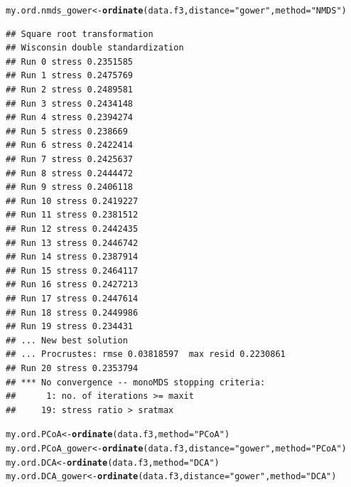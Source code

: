 \documentclass[12pt]{article}\usepackage[]{graphicx}\usepackage[]{color}
\makeatletter
\newcommand{\hlstr}[1]{\textcolor[rgb]{0.192,0.494,0.8}{#1}}%
\newcommand{\hlstd}[1]{\textcolor[rgb]{0.345,0.345,0.345}{#1}}%
\newcommand{\hlkwb}[1]{\textcolor[rgb]{0.69,0.353,0.396}{#1}}%
\newcommand{\hlkwc}[1]{\textcolor[rgb]{0.333,0.667,0.333}{#1}}%
\newcommand{\hlkwd}[1]{\textcolor[rgb]{0.737,0.353,0.396}{\textbf{#1}}}%
\newenvironment{kframe}{%
 \def\at@end@of@kframe{}%
 \ifinner\ifhmode%
  \def\at@end@of@kframe{\end{minipage}}%
  \begin{minipage}{\columnwidth}%
 \fi\fi%
 \def\FrameCommand##1{\hskip\@totalleftmargin \hskip-\fboxsep
 \colorbox{shadecolor}{##1}\hskip-\fboxsep
     \hskip-\linewidth \hskip-\@totalleftmargin \hskip\columnwidth}%
 \MakeFramed {\advance\hsize-\width
   \@totalleftmargin\z@ \linewidth\hsize
   \@setminipage}}%
 {\par\unskip\endMakeFramed%
 \at@end@of@kframe}
\newenvironment{knitrout}{}{} %
\numberwithin{figure}{section}
\makeatother
\begin{document}
\begin{knitrout}\small
{}\color{fgcolor}\begin{kframe}
\begin{alltt}
\hlstd{my.ord.nmds_gower} \hlkwb{<-} \hlkwd{ordinate}\hlstd{(data.f3,} \hlkwc{distance} \hlstd{=} \hlstr{"gower"}\hlstd{,}  \hlkwc{method} \hlstd{=} \hlstr{"NMDS"}\hlstd{)}
\end{alltt}
\begin{verbatim}
## Square root transformation
## Wisconsin double standardization
## Run 0 stress 0.2351585 
## Run 1 stress 0.2475769 
## Run 2 stress 0.2489581 
## Run 3 stress 0.2434148 
## Run 4 stress 0.2394274 
## Run 5 stress 0.238669 
## Run 6 stress 0.2422414 
## Run 7 stress 0.2425637 
## Run 8 stress 0.2444472 
## Run 9 stress 0.2406118 
## Run 10 stress 0.2419227 
## Run 11 stress 0.2381512 
## Run 12 stress 0.2442435 
## Run 13 stress 0.2446742 
## Run 14 stress 0.2387914 
## Run 15 stress 0.2464117 
## Run 16 stress 0.2427213 
## Run 17 stress 0.2447614 
## Run 18 stress 0.2449986 
## Run 19 stress 0.234431 
## ... New best solution
## ... Procrustes: rmse 0.03818597  max resid 0.2230861 
## Run 20 stress 0.2353794 
## *** No convergence -- monoMDS stopping criteria:
##      1: no. of iterations >= maxit
##     19: stress ratio > sratmax
\end{verbatim}
\begin{alltt}
\hlstd{my.ord.PCoA} \hlkwb{<-} \hlkwd{ordinate}\hlstd{(data.f3,} \hlkwc{method} \hlstd{=} \hlstr{"PCoA"}\hlstd{)}
\hlstd{my.ord.PCoA_gower} \hlkwb{<-} \hlkwd{ordinate}\hlstd{(data.f3,} \hlkwc{distance} \hlstd{=} \hlstr{"gower"}\hlstd{,} \hlkwc{method} \hlstd{=} \hlstr{"PCoA"}\hlstd{)}
\hlstd{my.ord.DCA} \hlkwb{<-} \hlkwd{ordinate}\hlstd{(data.f3,} \hlkwc{method} \hlstd{=} \hlstr{"DCA"}\hlstd{)}
\hlstd{my.ord.DCA_gower} \hlkwb{<-} \hlkwd{ordinate}\hlstd{(data.f3,} \hlkwc{distance} \hlstd{=} \hlstr{"gower"}\hlstd{,} \hlkwc{method} \hlstd{=} \hlstr{"DCA"}\hlstd{)}


\end{alltt}
\end{kframe}
\end{knitrout}
\end{document}
